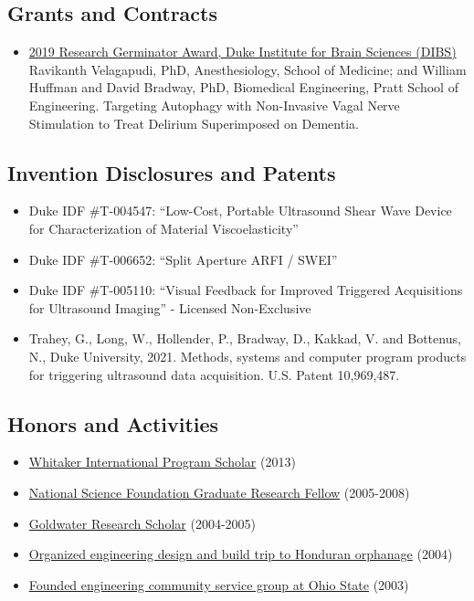 \documentclass[
]{article}
\providecommand{\tightlist}{%
  \setlength{\itemsep}{0pt}\setlength{\parskip}{0pt}}
\begin{document}
\subsection{Grants and Contracts}\label{grants-and-contracts}

\begin{itemize}
\tightlist
\item
  \href{https://dibs.duke.edu/research/awards/schedule-application}{2019
  Research Germinator Award, Duke Institute for Brain Sciences (DIBS)}
  Ravikanth Velagapudi, PhD, Anesthesiology, School of Medicine; and
  William Huffman and David Bradway, PhD, Biomedical Engineering, Pratt
  School of Engineering. Targeting Autophagy with Non-Invasive Vagal
  Nerve Stimulation to Treat Delirium Superimposed on Dementia.
\end{itemize}

\subsection{Invention Disclosures and
Patents}\label{invention-disclosures-and-patents}

\begin{itemize}
\tightlist
\item
  Duke IDF \#T-004547: ``Low-Cost, Portable Ultrasound Shear Wave Device
  for Characterization of Material Viscoelasticity''
\item
  Duke IDF \#T-006652: ``Split Aperture ARFI / SWEI''
\item
  Duke IDF \#T-005110: ``Visual Feedback for Improved Triggered
  Acquisitions for Ultrasound Imaging'' - Licensed Non-Exclusive
\item
  Trahey, G., Long, W., Hollender, P., Bradway, D., Kakkad, V. and
  Bottenus, N., Duke University, 2021. Methods, systems and computer
  program products for triggering ultrasound data acquisition. U.S.
  Patent 10,969,487.
\end{itemize}

\subsection{Honors and Activities}\label{honors-and-activities}

\begin{itemize}
\tightlist
\item
  \href{http://www.whitaker.org/grants/fellows-scholars}{Whitaker
  International Program Scholar} (2013)
\item
  \href{http://www.nsfgrfp.org/}{National Science Foundation Graduate
  Research Fellow} (2005-2008)
\item
  \href{https://goldwater.scholarsapply.org/}{Goldwater Research
  Scholar} (2004-2005)
\item
  \href{http://www.montanadeluz.org/}{Organized engineering design and
  build trip to Honduran orphanage} (2004)
\item
  \href{http://ecos.osu.edu/}{Founded engineering community service
  group at Ohio State} (2003)
\end{itemize}
\end{document}
